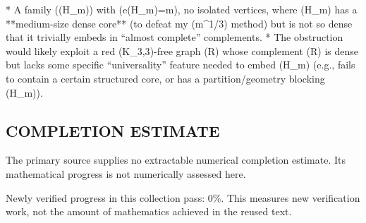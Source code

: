 * A family ((H_m)) with (e(H_m)=m), no isolated vertices, where (H_m) has a **medium-size dense core** (to defeat my (\Delta\le m^{1/3}) method) but is not so dense that it trivially embeds in “almost complete” complements.
* The obstruction would likely exploit a red (K_{3,3})-free graph (R) whose complement (\overline R) is dense but lacks some specific “universality” feature needed to embed (H_m) (e.g., fails to contain a certain structured core, or has a partition/geometry blocking (H_m)).



\subsection*{COMPLETION ESTIMATE}
The primary source supplies no extractable numerical completion estimate. Its mathematical progress is not numerically assessed here.

Newly verified progress in this collection pass: $0\%$. This measures new verification work, not the amount of mathematics achieved in the reused text.
